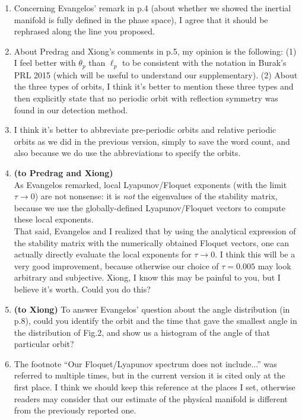 \begin{description}
\begin{enumerate}
\item
Concerning Evangelos' remark in p.4 (about whether we showed the inertial manifold is fully defined in the phase space), I agree that it should be rephrased along the line you proposed.

\item
About Predrag and Xiong's comments in p.5, my opinion is the following: (1) I feel better with $\theta_p$ than $\ell_p$ to be consistent with the notation in Burak's PRL 2015 (which will be useful to understand our supplementary). (2) About the three types of orbits, I think it's better to mention these three types and then explicitly state that no periodic orbit with reflection symmetry was found in our detection method.

\item
I think it's better to abbreviate pre-periodic orbits and relative periodic orbits as we did in the previous version, simply to save the word count, and also because we do use the abbreviations to specify the orbits.

\item \textbf{(to Predrag and Xiong)}\\
As Evangelos remarked, local Lyapunov/Floquet exponents (with the limit $\tau\to 0$) are not nonsense: it is \textit{not} the eigenvalues of the stability matrix, because we use the globally-defined Lyapunov/Floquet vectors to compute these local exponents.\\
That said, Evangelos and I realized that by using the analytical expression of the stability matrix with the numerically obtained Floquet vectors, one can actually directly evaluate the local exponents for $\tau \to 0$. I think this will be a very good improvement, because otherwise our choice of $\tau=0.005$ may look arbitrary and subjective. Xiong, I know this may be painful to you, but I believe it's worth. Could you do this?

\item \textbf{(to Xiong)}
To answer Evangelos' question about the angle distribution (in p.8), could you identify the orbit and the time that gave the smallest angle in the distribution of Fig.2, and show us a histogram of the angle of that particular orbit?

\item
The footnote ``Our Floquet/Lyapunov spectrum does not include...'' was referred to multiple times, but in the current version it is cited only at the first place. I think we should keep this reference at the places I set, otherwise readers may consider that our estimate of the physical manifold is different from the previously reported one.


\end{enumerate}
\end{description}
